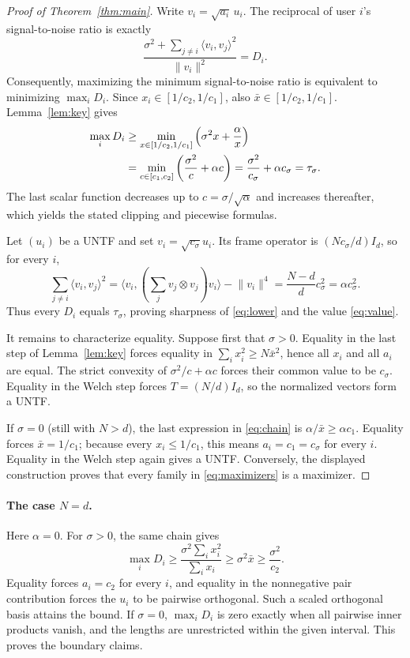 \documentclass[11pt]{article}
\newcommand{\ip}[2]{\langle #1,#2\rangle}
\begin{document}
\begin{proof}[Proof of Theorem~\ref{thm:main}]
Write $v_i=\sqrt{a_i}\,u_i$.  The reciprocal of user $i$'s signal-to-noise
ratio is exactly
\[
 \frac{\sigma^2+\sum_{j\ne i}\ip{v_i}{v_j}^2}{\lVert v_i\rVert^2}
 =D_i.
\]
Consequently, maximizing the minimum signal-to-noise ratio is equivalent to
minimizing $\max_iD_i$.  Since $x_i\in[1/c_2,1/c_1]$, also
$\bar x\in[1/c_2,1/c_1]$.  Lemma~\ref{lem:key} gives
\begin{align}
 \max_iD_i
 &\ge \min_{x\in[1/c_2,1/c_1]}
       \left(\sigma^2x+\frac\alpha x\right)\notag\\
 &=\min_{c\in[c_1,c_2]}
       \left(\frac{\sigma^2}{c}+\alpha c\right)
 =\frac{\sigma^2}{c_\sigma}+\alpha c_\sigma
 =\tau_\sigma.\label{eq:lower}
\end{align}
The last scalar function decreases up to
$c=\sigma/\sqrt\alpha$ and increases thereafter, which yields the stated
clipping and piecewise formulas.

Let $(u_i)$ be a UNTF and set $v_i=\sqrt{c_\sigma}u_i$.  Its frame operator is
$(Nc_\sigma/d)I_d$, so for every $i$,
\[
 \sum_{j\ne i}\ip{v_i}{v_j}^2
 =\ip{v_i}{\left(\sum_jv_j\otimes v_j\right)v_i}
   -\lVert v_i\rVert^4
 =\frac{N-d}{d}c_\sigma^2=\alpha c_\sigma^2.
\]
Thus every $D_i$ equals $\tau_\sigma$, proving sharpness of
\eqref{eq:lower} and the value \eqref{eq:value}.

It remains to characterize equality.  Suppose first that $\sigma>0$.
Equality in the last step of Lemma~\ref{lem:key} forces equality in
$\sum_i x_i^2\ge N\bar x^2$, hence all $x_i$ and all $a_i$ are equal.  The
strict convexity of $\sigma^2/c+\alpha c$ forces their common value to be
$c_\sigma$.  Equality in the Welch step forces
$T=(N/d)I_d$, so the normalized vectors form a UNTF.

If $\sigma=0$ (still with $N>d$), the last expression in
\eqref{eq:chain} is $\alpha/\bar x\ge\alpha c_1$.  Equality forces
$\bar x=1/c_1$; because every $x_i\le1/c_1$, this means $a_i=c_1=c_\sigma$
for every $i$.  Equality in the Welch step again gives a UNTF.  Conversely,
the displayed construction proves that every family in
\eqref{eq:maximizers} is a maximizer.
\end{proof}

\paragraph{The case $N=d$.}
Here $\alpha=0$.  For $\sigma>0$, the same chain gives
\[
 \max_iD_i\ge
 \frac{\sigma^2\sum_i x_i^2}{\sum_i x_i}
 \ge\sigma^2\bar x\ge\frac{\sigma^2}{c_2}.
\]
Equality forces $a_i=c_2$ for every $i$, and equality in the nonnegative
pair contribution forces the $u_i$ to be pairwise orthogonal.  Such a scaled
orthogonal basis attains the bound.  If $\sigma=0$, $\max_iD_i$ is zero
exactly when all pairwise inner products vanish, and the lengths
are unrestricted within the given interval.  This proves the boundary claims.
\end{document}

